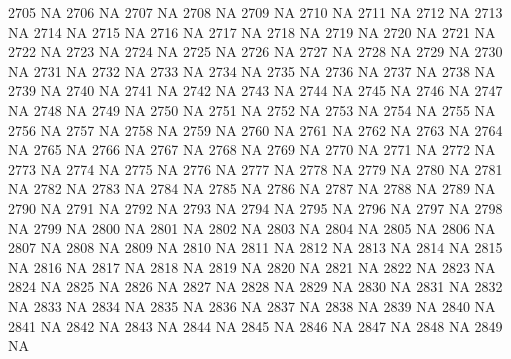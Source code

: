 \documentclass{article}
\begin{document}
\begin{Schunk}
\begin{Soutput}
2705           NA
2706           NA
2707           NA
2708           NA
2709           NA
2710           NA
2711           NA
2712           NA
2713           NA
2714           NA
2715           NA
2716           NA
2717           NA
2718           NA
2719           NA
2720           NA
2721           NA
2722           NA
2723           NA
2724           NA
2725           NA
2726           NA
2727           NA
2728           NA
2729           NA
2730           NA
2731           NA
2732           NA
2733           NA
2734           NA
2735           NA
2736           NA
2737           NA
2738           NA
2739           NA
2740           NA
2741           NA
2742           NA
2743           NA
2744           NA
2745           NA
2746           NA
2747           NA
2748           NA
2749           NA
2750           NA
2751           NA
2752           NA
2753           NA
2754           NA
2755           NA
2756           NA
2757           NA
2758           NA
2759           NA
2760           NA
2761           NA
2762           NA
2763           NA
2764           NA
2765           NA
2766           NA
2767           NA
2768           NA
2769           NA
2770           NA
2771           NA
2772           NA
2773           NA
2774           NA
2775           NA
2776           NA
2777           NA
2778           NA
2779           NA
2780           NA
2781           NA
2782           NA
2783           NA
2784           NA
2785           NA
2786           NA
2787           NA
2788           NA
2789           NA
2790           NA
2791           NA
2792           NA
2793           NA
2794           NA
2795           NA
2796           NA
2797           NA
2798           NA
2799           NA
2800           NA
2801           NA
2802           NA
2803           NA
2804           NA
2805           NA
2806           NA
2807           NA
2808           NA
2809           NA
2810           NA
2811           NA
2812           NA
2813           NA
2814           NA
2815           NA
2816           NA
2817           NA
2818           NA
2819           NA
2820           NA
2821           NA
2822           NA
2823           NA
2824           NA
2825           NA
2826           NA
2827           NA
2828           NA
2829           NA
2830           NA
2831           NA
2832           NA
2833           NA
2834           NA
2835           NA
2836           NA
2837           NA
2838           NA
2839           NA
2840           NA
2841           NA
2842           NA
2843           NA
2844           NA
2845           NA
2846           NA
2847           NA
2848           NA
2849           NA

\end{Soutput}
\end{Schunk}
\end{document}
